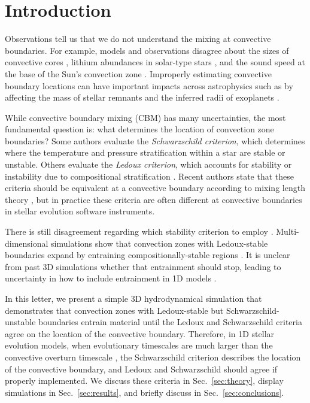 
\section{Introduction}
\label{sec:introduction}
Observations tell us that we do not understand the mixing at convective boundaries.
For example, models and observations disagree about the sizes of convective cores \citep{claret_torres_2018, viani_basu_2020, pedersen_etal_2021, johnston_2021}, lithium abundances in solar-type stars \citep{pinsonneault_1997, sestito_randich_2005, carlos_etal_2019, dumont_etal_2021}, and the sound speed at the base of the Sun's convection zone \citep[see][Sec.~7.2.1]{basu_2016}.
Improperly estimating convective boundary locations can have important impacts across astrophysics such as by affecting the mass of stellar remnants \citep{farmer_etal_2019, mehta_etal_2022} and the inferred radii of exoplanets \citep{basu_etal_2012, morrell_2020}.

While convective boundary mixing (CBM) has many uncertainties, the most fundamental question is: what determines the location of convection zone boundaries? 
Some authors evaluate the \emph{Schwarzschild criterion}, which determines where the temperature and pressure stratification within a star are stable or unstable.
Others evaluate the \emph{Ledoux criterion}, which accounts for stability or instability due to compositional stratification \citep[e.g., the variation of helium abundance with pressure; see][chapter 3, which reviews these criteria]{salaris_cassisi_2017}.
Recent authors state that these criteria should be equivalent at a convective boundary according to mixing length theory \citep{gabriel_etal_2014, mesa4, mesa5}, but in practice these criteria are often different at convective boundaries in stellar evolution software instruments.

There is still disagreement regarding which stability criterion to employ \citep[discussed in][chapter 2]{kaiser_etal_2020}.
Multi-dimensional simulations show that convection zones with Ledoux-stable boundaries expand by entraining compositionally-stable regions \citep{meakin_arnett_2007, woodward_etal_2015, jones_etal_2017, cristini_etal_2019, fuentes_cumming_2020, andrassy_etal_2020, andrassy_etal_2021}.
It is unclear from past 3D simulations whether that entrainment should stop, leading to uncertainty in how to include entrainment in 1D models \citep{staritsin_2013, scott_etal_2021}.

In this letter, we present a simple 3D hydrodynamical simulation that demonstrates that convection zones with Ledoux-stable but Schwarzschild-unstable boundaries entrain material until the Ledoux and Schwarzschild criteria agree on the location of the convective boundary.
Therefore, in 1D stellar evolution models, when evolutionary timescales are much larger than the convective overturn timescale \citep[such as on the main sequence, see][]{georgy_etal_2021}, the Schwarzschild criterion describes the location of the convective boundary, and Ledoux and Schwarzschild should agree if properly implemented.
We discuss these criteria in Sec.~\ref{sec:theory}, display simulations in Sec.~\ref{sec:results}, and briefly discuss in Sec.~\ref{sec:conclusions}.

